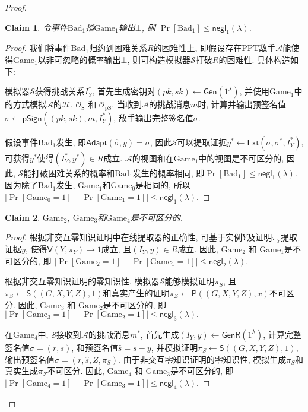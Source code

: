 \documentclass[review]{jcr}
\newtheorem{claim}{Claim}
\begin{document}
\begin{proof}
\begin{claim}
令事件$\text{Bad}_1$指$\text{Game}_1$输出$\bot$, 则 $\Pr[\text{Bad}_1] \leq \mathsf{negl}_1(\lambda)$.
\end{claim}

\begin{proof}
我们将事件$\text{Bad}_1$归约到困难关系$R$的困难性上, 即假设存在PPT敌手$\mathcal{A}$能使得$\text{Game}_1$以非可忽略的概率输出$\bot$, 则可构造模拟器$\mathcal{S}$打破$R$的困难性. 具体构造如下: 

模拟器$\mathcal{S}$获得挑战关系$I_Y^*$, 首先生成密钥对$(pk, sk)\leftarrow \mathsf{Gen}(1^\lambda)$, 并使用$\text{Game}_1$中的方式模拟$\mathcal{A}$的$\mathcal{H}$, $\mathcal{O}_{\text{S}}$ 和 $\mathcal{O}_{\text{pS}}$. 当收到$\mathcal{A}$的挑战消息$m$时, 计算并输出预签名值$\hat{\sigma}\leftarrow \mathsf{pSign}((pk,sk), m, I_Y^*)$, 敌手输出完整签名值$\sigma$. 

假设事件$\text{Bad}_1$发生, 即$\mathsf{Adapt}(\hat{\sigma},y) = \sigma$, 因此$\mathcal{S}$可以提取证据$y^*\leftarrow\mathsf{Ext}(\sigma, \sigma^*, I_Y^*)$, 可获得$y^*$使得$(I_Y^*, y^*)\in R$成立. $\mathcal{A}$的视图和在$\text{Game}_1$中的视图是不可区分的, 因此, $\mathcal{S}$能打破困难关系的概率和$\text{Bad}_1$发生的概率相同, 即$\Pr[\text{Bad}_1] \leq \mathsf{negl}_1(\lambda)$. 因为除了$\text{Bad}_1$发生, $\text{Game}_1$和$\text{Game}_0$是相同的, 所以 $|\Pr[\text{Game}_0 = 1]-\Pr[\text{Game}_1 = 1]|\leq \mathsf{negl}_1(\lambda).$
\end{proof}

\begin{claim}
$\text{Game}_2$, $\text{Game}_3$和$\text{Game}_4$是不可区分的. 
\end{claim}

\begin{proof}
根据非交互零知识证明中在线提取器的正确性, 可基于实例$Y$及证明$\pi_Y$提取证据$y$, 使得$\mathsf{V}(Y, \pi_Y) \rightarrow 1$成立, 且$(I_Y, y) \in R$成立. 因此, $\text{Game}_2$ 和 $\text{Game}_1$是不可区分的, 即
$|\Pr[\text{Game}_2 = 1] - \Pr[\text{Game}_1 = 1]|\leq \mathsf{negl}_2(\lambda).$

根据非交互零知识证明的零知识性, 模拟器$\mathcal{S}$能够模拟证明$\pi_S$, 且$\pi_S\leftarrow \mathsf{S}((G,X,Y,Z),1)$和真实产生的证明$\pi_Z\leftarrow \mathsf{P}((G,X,Y,Z), x)$不可区分. 因此, $\text{Game}_3$ 和 $\text{Game}_2$是不可区分的, 即
$|\Pr[\text{Game}_3 = 1]-\Pr[\text{Game}_2 = 1]| \leq \mathsf{negl}_3(\lambda).$

在$\text{Game}_4$中, $\mathcal{S}$接收到$\mathcal{A}$的挑战消息$m^*$, 首先生成$(I_Y,y)\leftarrow \mathsf{GenR}(1^\lambda)$, 计算完整签名值$\sigma=(r,s)$, 和预签名值$\hat{s}=s-y$, 并模拟证明$\pi_S\leftarrow \mathsf{S}((G,X,Y,Z),1)$, 输出预签名值$\hat{\sigma}=(r,\hat{s},Z,\pi_S)$. 由于非交互零知识证明的零知识性, 模拟生成$\pi_S$和真实生成$\pi_Z$不可区分. 因此, $\text{Game}_4$ 和 $\text{Game}_3$是不可区分的, 即
$|\Pr[\text{Game}_4 = 1]-\Pr[\text{Game}_3 = 1]| \leq  \mathsf{negl}_4(\lambda).$
\end{proof}


\end{proof}
\end{document}

